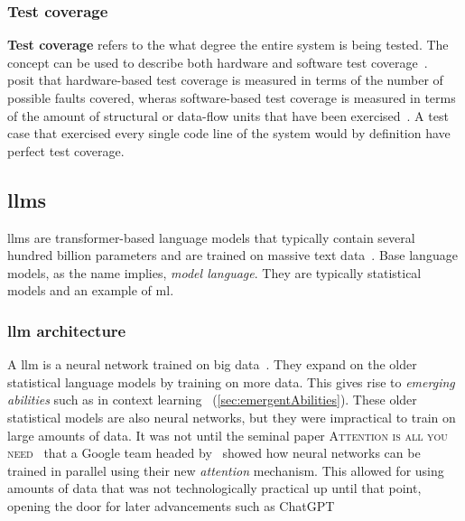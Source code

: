 \subsubsection{Test coverage}\label{sec:testCoverage}

\textbf{Test coverage} refers to the what degree the entire system is being tested. The concept can
be used to describe both hardware and software test
coverage~\cite[187]{testCoverage94}.~\citeauthor{testCoverage94} posit that hardware-based test
coverage is measured in terms of the number of possible faults covered, wheras software-based test
coverage is measured in terms of the amount of structural or data-flow units that have been
exercised~\cite[187]{testCoverage94}. A test case that exercised every single code line of the
system would by definition have perfect test coverage.

\subsection{\acrfull{llms}}

\acrfull{llms} are transformer-based language models that typically contain several hundred billion
parameters and are trained on massive text data~\cite[4]{llmSurvey}.
Base language models, as the name implies, \textit{model language}. They are typically statistical
models and an example of \acrfull{ml}.

\subsubsection*{\acrfull{llm} architecture}\label{sec:llmArch}

A \acrlong{llm} is a neural network trained on big
data~\cite[3]{llmSurvey}. They expand on the older statistical language models by
training on more data. This gives rise to \textit{emerging abilities} such as in
context learning~\cite[3]{llmSurvey} (\cref{sec:emergentAbilities}). These older statistical models are also
neural networks, but they were impractical to train on large amounts of data. It
was not until the seminal paper \textsc{Attention is all you
    need}~\cite{attentionIsAllYouNeed} that a Google team headed by~\citeauthor{attentionIsAllYouNeed} showed how neural networks
can be trained in parallel using their new \textit{attention} mechanism. This
allowed for using amounts of data that was not technologically practical up
until that point, opening the door for later advancements such as
ChatGPT~\cite[9]{llmSurvey}

